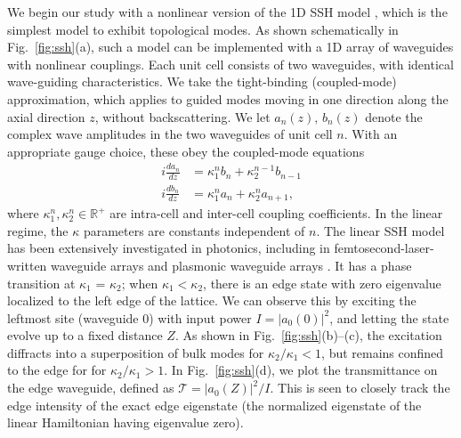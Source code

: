 \documentclass[aps,prx,twocolumn,superscriptaddress]{revtex4-1}
\begin{document}
We begin our study with a nonlinear version of the 1D SSH model \cite{alu2016}, which is the simplest model to exhibit topological modes. As shown schematically in Fig.~\ref{fig:ssh}(a), such a model can be implemented with a 1D array of waveguides with nonlinear couplings.  Each unit cell consists of two waveguides, with identical wave-guiding characteristics.  We take the tight-binding (coupled-mode) approximation, which applies to guided modes moving in one direction along the axial direction $z$, without backscattering.  We let $a_n(z),\, b_n(z)$ denote the complex wave amplitudes in the two waveguides of unit cell $n$.  With an appropriate gauge choice, these obey  the coupled-mode equations \cite{christodoulides1988}
\begin{align}
  i\frac{da_n}{dz} &= \kappa_1^n b_n + \kappa_2^{n-1} b_{n-1}\\
  i\frac{db_n}{dz} &= \kappa_1^n a_n + \kappa_2^n a_{n+1},
\end{align}
where $\kappa_{1}^n, \kappa_{2}^n \in \mathbb{R}^+$ are intra-cell and inter-cell coupling coefficients.  In the linear regime, the $\kappa$ parameters are constants independent of $n$. The linear SSH model has been extensively investigated in photonics, including in femtosecond-laser-written waveguide arrays \cite{zeuner2015prl, weimann2016nmaterial} and plasmonic waveguide arrays \cite{cheng2015lp}.  It has a phase transition at $\kappa_1$ = $\kappa_2$; when $\kappa_1 < \kappa_2$, there is an edge state with zero eigenvalue localized to the left edge of the lattice.  We can observe this by exciting the leftmost site (waveguide 0) with input power $I = |a_0(0)|^2$, and letting the state evolve up to a fixed distance $Z$.  As shown in Fig.~\ref{fig:ssh}(b)--(c), the excitation diffracts into a superposition of bulk modes for $\kappa_2/\kappa_1 < 1$, but remains confined to the edge for for $\kappa_2/\kappa_1 > 1$.  In Fig.~\ref{fig:ssh}(d), we plot the transmittance on the edge waveguide, defined as $\mathcal{T} = |a_0(Z)|^2/I$.  This is seen to closely track the edge intensity of the exact edge eigenstate (the normalized eigenstate of the linear Hamiltonian having eigenvalue zero).
\end{document}
